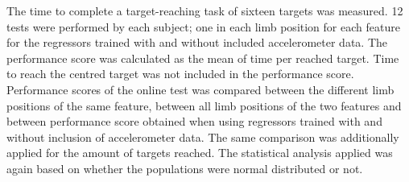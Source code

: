  The time to complete a target-reaching task of sixteen targets was measured. 12 tests were performed by each subject; one in each limb position for each feature for the regressors trained with and without included accelerometer data. The performance score was calculated as the mean of time per reached target. Time to reach the centred target was not included in the performance score. Performance scores of the online test was compared between the different limb positions of the same feature, between all limb positions of the two features and between performance score obtained when using regressors trained with and without inclusion of accelerometer data. The same comparison was additionally applied for the amount of targets reached. The statistical analysis applied was again based on whether the populations were normal distributed or not.
% 
